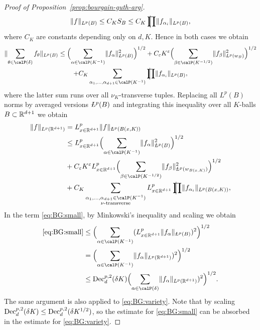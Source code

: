 \begin{proof}[Proof of Proposition~\ref{prop:bourgain-guth-arg}]
\[
\norm{f}_{L^{p}(B)}
\leq
C_{K} S_{B}
\leq
C_{K} \avprod \norm{f_{\alpha_{i}}}_{L^{p}(B)},
\]
where $C_{K}$ are constants depending only on $d,K$.
Hence in both cases we obtain
\begin{multline*}
\norm{\sum_{\theta\in\Part{\delta}} f_{\theta}}_{L^{p}(B)}
\leq
\Bigl( \sum_{\alpha\in\Part{K^{-1}}} \norm{f_{\alpha}}_{L^{p}(B)}^{2} \Bigr)^{1/2}
+
C_{\epsilon} K^{\epsilon} \Bigl( \sum_{\beta \in \Part{K^{-1/2}}} \norm{ f_{\beta} }_{L^{p}(w_{B})}^{2} \Bigr)^{1/2}\\
+
C_{K} \sum_{\alpha_{1},\dotsc,\alpha_{d+1}\in\Part{K^{-1}}} \avprod \norm{f_{\alpha_{i}}}_{L^{p}(B)},
\end{multline*}
where the latter sum runs over all $\nu_{K}$-transverse tuples.
Replacing all $L^{p}(B)$ norms by averaged versions $\avL^{p}(B)$ and integrating this inequality over all $K$-balls $B\subset\mathbb{R}^{d+1}$ we obtain
\begin{align}
\notag
\norm{f}_{L^{p}(\R^{d+1})}
&=
L^{p}_{x \in \R^{d+1}} \norm{f}_{\avL^{p}(B(x,K))}\\
\label{eq:BG:small} & \leq
L^{p}_{x \in \R^{d+1}} \Bigl( \sum_{\alpha\in\Part{K^{-1}}} \norm{f_{\alpha}}_{\avL^{p}(B)}^{2} \Bigr)^{1/2}\\
\label{eq:BG:variety}&+
C_{\epsilon} K^{\epsilon} L^{p}_{x \in \R^{d+1}} \Bigl( \sum_{\beta \in \Part{K^{-1/2}}} \norm{ f_{\beta} }_{\avL^{p}(w_{B(x,K)})}^{2} \Bigr)^{1/2}\\
\label{eq:BG:transverse}&+
C_{K} \sum_{\substack{\alpha_{1},\dotsc,\alpha_{d+1}\in\Part{K^{-1}}\\\nu\text{-transverse}}} L^{p}_{x \in \R^{d+1}} \avprod \norm{f_{\alpha_{i}}}_{L^{p}(B(x,K))},
\end{align}
In the term \eqref{eq:BG:small}, by Minkowski's inequality and scaling we obtain 
\begin{align*}
\eqref{eq:BG:small}
&\leq
\Bigl( \sum_{\alpha\in\Part{K^{-1}}} (L^{p}_{x \in \R^{d+1}} \norm{f_{\alpha}}_{\avL^{p}(B)})^{2} \Bigr)^{1/2}\\
&=
\Bigl( \sum_{\alpha\in\Part{K^{-1}}} \norm{f_{\alpha}}_{L^{p}(\R^{d+1})})^{2} \Bigr)^{1/2}\\
&\leq
\Dec^{p,2}_{d}(\delta K) \Bigl( \sum_{\alpha\in\Part{\delta}} \norm{f_{\alpha}}_{L^{p}(\R^{d+1})})^{2} \Bigr)^{1/2}.
\end{align*}
The same argument is also applied to \eqref{eq:BG:variety}.
Note that by scaling $\mathrm{Dec}_{d}^{p,2}(\delta K) \leq \mathrm{Dec}_{d}^{p,2}(\delta K^{1/2})$, so the estimate for \eqref{eq:BG:small} can be absorbed in the estimate for \eqref{eq:BG:variety}.


\end{proof}

